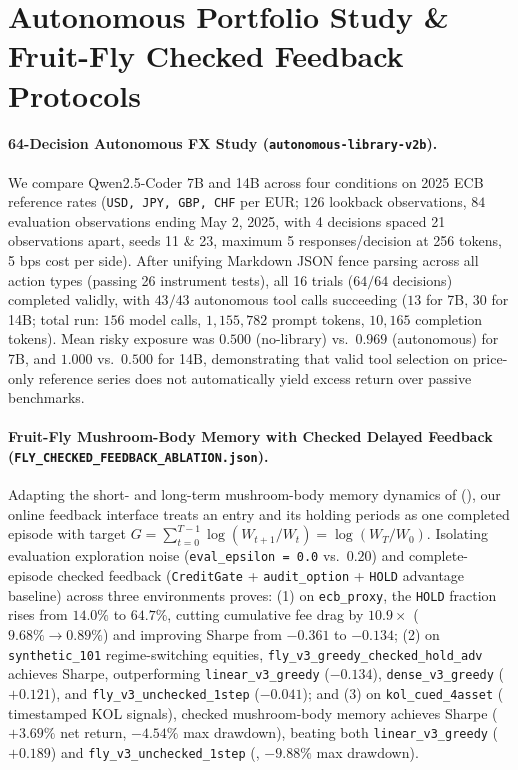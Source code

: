 \section{Autonomous Portfolio Study \& Fruit-Fly Checked Feedback Protocols}
\label{app:autonomous}
\label{app:fly}
\paragraph{64-Decision Autonomous FX Study (\texttt{autonomous-library-v2b}).}
We compare Qwen2.5-Coder 7B and 14B across four conditions on 2025 ECB reference rates (\texttt{USD, JPY, GBP, CHF} per EUR; $126$ lookback observations, $84$ evaluation observations ending May 2, 2025, with 4 decisions spaced 21 observations apart, seeds 11 \& 23, maximum 5 responses/decision at 256 tokens, 5 bps cost per side). After unifying Markdown JSON fence parsing across all action types (passing 26 instrument tests), all 16 trials ($64/64$ decisions) completed validly, with $43/43$ autonomous tool calls succeeding ($13$ for 7B, $30$ for 14B; total run: $156$ model calls, $1{,}155{,}782$ prompt tokens, $10{,}165$ completion tokens). Mean risky exposure was $0.500$ (no-library) vs.\ $0.969$ (autonomous) for 7B, and $1.000$ vs.\ $0.500$ for 14B, demonstrating that valid tool selection on price-only reference series does not automatically yield excess return over passive benchmarks.

\paragraph{Fruit-Fly Mushroom-Body Memory with Checked Delayed Feedback (\texttt{FLY\_CHECKED\_FEEDBACK\_ABLATION.json}).}
Adapting the short- and long-term mushroom-body memory dynamics of \citet{huang2024memory} (), our online feedback interface treats an entry and its holding periods as one completed episode with target $G = \sum_{t=0}^{T-1}\log(W_{t+1}/W_t) = \log(W_T/W_0)$. Isolating evaluation exploration noise (\texttt{eval\_epsilon = 0.0} vs.\ $0.20$) and complete-episode checked feedback (\texttt{CreditGate} + \texttt{audit\_option} + \texttt{HOLD} advantage baseline) across three environments proves: (1) on \texttt{ecb\_proxy}, the \texttt{HOLD} fraction rises from $14.0\%$ to $64.7\%$, cutting cumulative fee drag by $10.9\times$ ($9.68\% \to 0.89\%$) and improving Sharpe from $-0.361$ to $-0.134$; (2) on \texttt{synthetic\_101} regime-switching equities, \texttt{fly\_v3\_greedy\_checked\_hold\_adv} achieves \textbf{\FlySynCheckedSharpe{}} Sharpe, outperforming \texttt{linear\_v3\_greedy} ($-0.134$), \texttt{dense\_v3\_greedy} ($+0.121$), and \texttt{fly\_v3\_unchecked\_1step} ($-0.041$); and (3) on \texttt{kol\_cued\_4asset} (\KOLPredRows{} timestamped KOL signals), checked mushroom-body memory achieves \textbf{\FlyKOLCheckedSharpe{}} Sharpe ($+3.69\%$ net return, $-4.54\%$ max drawdown), beating both \texttt{linear\_v3\_greedy} ($+0.189$) and \texttt{fly\_v3\_unchecked\_1step} (\textbf{\FlyKOLUncheckedSharpe{}}, $-9.88\%$ max drawdown).


